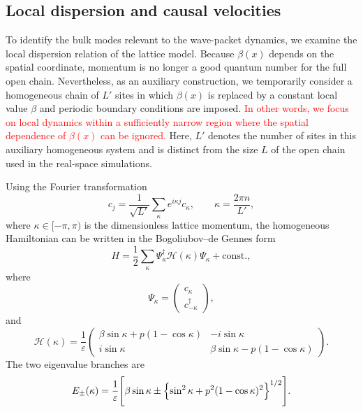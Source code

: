 \documentclass[reprint,amsmath,amssymb,aps,showkeys,superscriptaddress]{revtex4-2}
\newcommand{\red}{\textcolor{red}}
\begin{document}
\subsection{Local dispersion and causal velocities}
\label{subsec:dispersion}

To identify the bulk modes relevant to the wave-packet dynamics, we
examine the local dispersion relation of the lattice model. Because 
$\beta(x)$ depends on the spatial coordinate, momentum is no longer a good quantum number for
the full open chain. Nevertheless, as an auxiliary construction, we temporarily consider a homogeneous
chain of $L'$ sites in which $\beta(x)$ is replaced by a constant
local value $\beta$ and periodic boundary conditions are imposed.
\red{In other words, we focus on local dynamics within a sufficiently narrow region where the spatial dependence of $\beta(x)$ can be ignored. }
Here, $L'$ denotes the number of sites in this auxiliary homogeneous
system and is distinct from the size $L$ of the open chain used in
the real-space simulations.

Using the Fourier transformation
\begin{equation}
  c_j
  =
  \frac{1}{\sqrt{L'}}
  \sum_{\kappa}
  e^{i\kappa j}c_{\kappa},
  \qquad
  \kappa=\frac{2\pi n}{L'},
  \label{eq:Fourier_transform}
\end{equation}
where $\kappa\in[-\pi,\pi)$ is the dimensionless lattice momentum,
the homogeneous Hamiltonian can be written in the
Bogoliubov--de Gennes form
\begin{equation}
  H
  =
  \frac{1}{2}
  \sum_{\kappa}
  \Psi_{\kappa}^{\dagger}
  \mathcal{H}(\kappa)
  \Psi_{\kappa}
  +\mathrm{const.},
  \label{eq:BdG_Hamiltonian}
\end{equation}
where
\begin{equation}
  \Psi_{\kappa}
  =
  \begin{pmatrix}
    c_{\kappa}\\
    c_{-\kappa}^{\dagger}
  \end{pmatrix},
  \label{eq:Nambu_spinor}
\end{equation}
and
\begin{equation}
  \mathcal{H}(\kappa)
  =
  \frac{1}{\varepsilon}
  \begin{pmatrix}
    \beta\sin\kappa
    +p(1-\cos\kappa)
      & -i\sin\kappa
    \\
    i\sin\kappa
      & \beta\sin\kappa
        -p(1-\cos\kappa)
  \end{pmatrix}.
  \label{eq:BdG_matrix}
\end{equation}
The two eigenvalue branches are
\begin{equation}
\begin{aligned}
  E_{\pm}(\kappa)
  =
  \frac{1}{\varepsilon}
  \Biggl[
    \beta\sin\kappa
    \mathbin{\pm}
    \Bigl\{
      \sin^{2}\kappa
      +p^{2}(1-\cos\kappa)^{2}
    \Bigr\}^{1/2}
  \Biggr].
\end{aligned}
  \label{eq:lattice_dispersion}
\end{equation}
\end{document}
